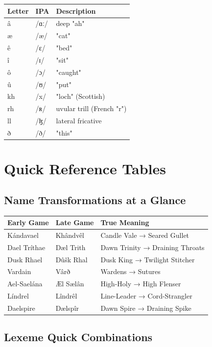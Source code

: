 \documentclass[11pt,a4paper,twoside]{book}
\begin{document}
\begin{center}
\begin{tabular}{lll}
\textbf{Letter} & \textbf{IPA} & \textbf{Description} \\
\hline
â & /ɑː/ & deep "ah" \\
æ & /æ/ & "cat" \\
ê & /ɛ/ & "bed" \\
î & /ɪ/ & "sit" \\
ô & /ɔ/ & "caught" \\
û & /ʊ/ & "put" \\
\hline
kh & /x/ & "loch" (Scottish) \\
rh & /ʀ/ & uvular trill (French "r") \\
ll & /ɮ/ & lateral fricative \\
ð & /ð/ & "this" \\
\end{tabular}
\end{center}

\chapter{Quick Reference Tables}

\section{Name Transformations at a Glance}

\begin{center}
\small
\begin{tabular}{|l|l|l|}
\hline
\textbf{Early Game} & \textbf{Late Game} & \textbf{True Meaning} \\
\hline
Kándavael & Khândvêl & Candle Vale → Seared Gullet \\
Dael Tríthae & Dæl Trith & Dawn Trinity → Draining Throats \\
Dusk Rhael & Dûšk Rhal & Dusk King → Twilight Stitcher \\
Vardain & Vârð & Wardens → Sutures \\
Ael-Saelána & Æl Sælân & High-Holy → High Flenser \\
Líndrel & Lîndrêl & Line-Leader → Cord-Strangler \\
Daelspire & Dælspîr & Dawn Spire → Draining Spike \\
\hline
\end{tabular}
\end{center}

\section{Lexeme Quick Combinations}
\end{document}

